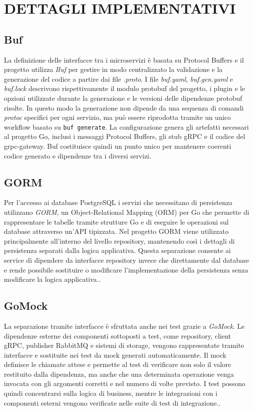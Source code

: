 \documentclass[conference]{IEEEtran}
\begin{document}
\section{DETTAGLI IMPLEMENTATIVI}
\subsection{Buf}
La definizione delle interfacce tra i microservizi è basata su Protocol Buffers e il progetto utilizza \textit{Buf} per gestire in modo centralizzato la validazione e la generazione del codice a partire dai file \textit{.proto}. I file \textit{buf.yaml}, \textit{buf.gen.yaml} e \textit{buf.lock} descrivono rispettivamente il modulo protobuf del progetto, i plugin e le opzioni utilizzate durante la generazione e le versioni delle dipendenze protobuf risolte. In questo modo la generazione non dipende da una sequenza di comandi \textit{protoc} specifici per ogni servizio, ma può essere riprodotta tramite un unico workflow basato su \texttt{buf generate}. La configurazione genera gli artefatti necessari al progetto Go, inclusi i messaggi Protocol Buffers, gli stub gRPC e il codice del grpc-gateway. Buf costituisce quindi un punto unico per mantenere coerenti codice generato e dipendenze tra i diversi servizi\cite{b12}.
\subsection{GORM}
Per l'accesso ai database PostgreSQL i servizi che necessitano di persistenza utilizzano \textit{GORM}, un Object-Relational Mapping (ORM) per Go che permette di rappresentare le tabelle tramite strutture Go e di eseguire le operazioni sul database attraverso un'API tipizzata. Nel progetto GORM viene utilizzato principalmente all'interno del livello repository, mantenendo così i dettagli di persistenza separati dalla logica applicativa. Questa separazione consente ai service di dipendere da interfacce repository invece che direttamente dal database e rende possibile sostituire o modificare l'implementazione della persistenza senza modificare la logica applicativa.\cite{b15}.
\subsection{GoMock}
La separazione tramite interfacce è sfruttata anche nei test grazie a \textit{GoMock}. Le dipendenze esterne dei componenti sottoposti a test, come repository, client gRPC, publisher RabbitMQ e sistemi di storage, vengono rappresentate tramite interfacce e sostituite nei test da mock generati automaticamente. Il mock definisce le chiamate attese e permette al test di verificare non solo il valore restituito dalla dipendenza, ma anche che una determinata operazione venga invocata con gli argomenti corretti e nel numero di volte previsto. I test possono quindi concentrarsi sulla logica di business, mentre le integrazioni con i componenti esterni vengono verificate nelle suite di test di integrazione.\cite{b16}.
\end{document}
